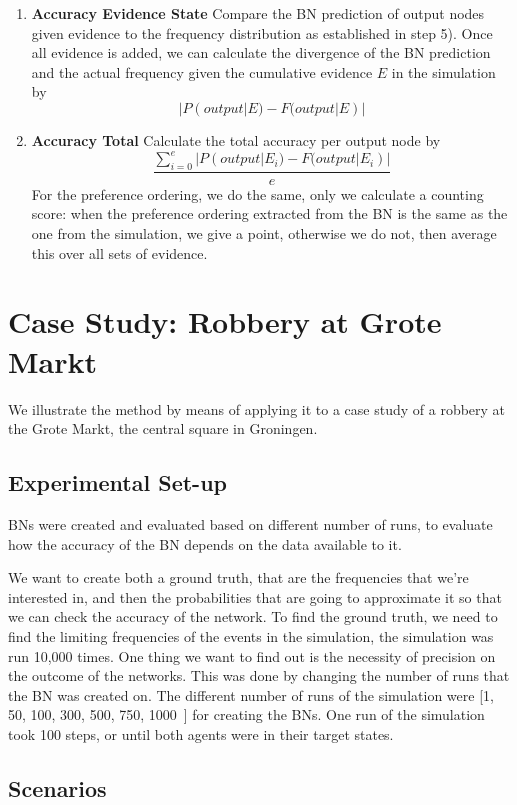 \documentclass[12pt]{article}
\begin{document}
\begin{enumerate}
\item \textbf{Accuracy Evidence State} Compare the BN prediction of output nodes given evidence to the frequency distribution as established in step 5). Once all evidence is added, we can calculate the divergence of the BN prediction and the actual frequency given the cumulative evidence $E$ in the simulation by \[|P(output|E) - F(output|E)|\]
\item \textbf{Accuracy Total} Calculate the total accuracy per output node by \[\frac{\sum_{i=0}^{e}|P(output | E_i) - F(output| E_i)|}{e}\] For the preference ordering, we do the same, only we calculate a counting score: when the preference ordering extracted from the BN is the same as the one from the simulation, we give a point, otherwise we do not, then average this over all sets of evidence.
\end{enumerate}


\newpage


\section{Case Study: Robbery at Grote Markt}
We illustrate the method by means of applying it to a case study of a robbery at the Grote Markt, the central square in Groningen.

\subsection{Experimental Set-up}
BNs were created and evaluated based on different number of runs, to evaluate how the accuracy of the BN depends on the data available to it. 

We want to create both a ground truth, that are the frequencies that we're interested in, and then the probabilities that are going to approximate it so that we can check the accuracy of the network. To find the ground truth, we need to find the limiting frequencies of the events in the simulation, the simulation was run 10,000 times. One thing we want to find out is the necessity of precision on the outcome of the networks. This was done by changing the number of runs that the BN was created on. The different number of runs of the simulation were [1, 50, 100, 300, 500, 750, 1000~] for creating the BNs. One run of the simulation took 100 steps, or until both agents were in their target states. 


\subsection{Scenarios}
\end{document}
